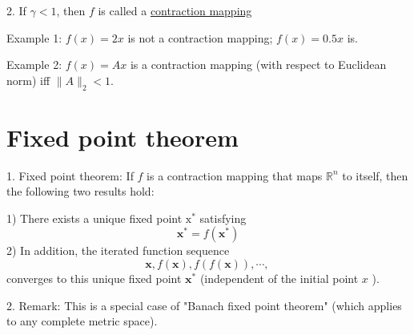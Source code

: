 \documentclass[11pt]{elegantbook}
\begin{document}
2. If $\gamma<1$, then $f$ is called a \underline{contraction mapping}

Example 1: $f(x)=2 x$ is not a contraction mapping; $f(x)=0.5 x$ is.

Example 2: $f(x)=A x$ is a contraction mapping (with respect to Euclidean norm) iff $\|A\|_{2}<1$.



\chapter{Fixed point theorem}
1. Fixed point theorem: If $f$ is a contraction mapping that maps $\mathbb{R}^{n}$ to itself, then the following two results hold:

1) There exists a unique fixed point $\mathrm{x}^{*}$ satisfying
$$
\mathbf{x}^{*}=f\left(\mathbf{x}^{*}\right)
$$
2) In addition, the iterated function sequence
$$
\mathbf{x}, f(\mathbf{x}), f(f(\mathbf{x})), \cdots \text {, }
$$
converges to this unique fixed point $\mathbf{x}^{*}$ (independent of the initial point $x$ ).

2. Remark: This is a special case of "Banach fixed point theorem" (which applies to any complete metric space).
\end{document}
